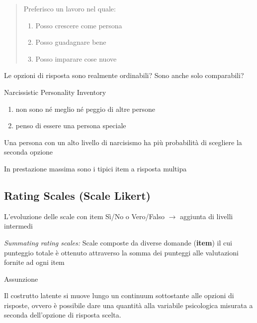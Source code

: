 \documentclass[compress]{beamer}
\begin{document}
\begin{frame}
	
	\begin{quote}
		
		Preferisco un lavoro nel quale: 
		
		\begin{enumerate}
			\item Posso crescere come persona
			\item Posso guadagnare bene
			\item Posso imparare cose nuove
		\end{enumerate}
	\end{quote}
	
	\vspace{2.5mm}
	Le opzioni di risposta sono realmente ordinabili? Sono anche solo comparabili?
	
	\begin{block}{Narcissistic Personality Inventory}
		
		\begin{enumerate}
			\item non sono né meglio né peggio di altre persone
			\item penso di essere una persona speciale 
		\end{enumerate}
		
		Una persona con un alto livello di narcisismo ha più probabilità di scegliere la seconda opzione
	\end{block}
	
	In prestazione massima sono i tipici item a risposta multipa
\end{frame}

\subsection*{Rating Scales (Scale Likert)}


\begin{frame}
	
	L'evoluzione delle scale con item Sì/No o Vero/Falso $\rightarrow$ aggiunta di livelli intermedi
	
	\emph{Summating rating scales:} Scale composte da diverse domande (\textbf{item}) il cui punteggio totale è ottenuto attraverso la somma dei punteggi alle valutazioni fornite ad ogni item
	
	\pause
	\begin{block}{Assunzione}
		
		Il costrutto latente si muove lungo un continuum sottostante alle opzioni di risposte, ovvero è possibile dare una quantità alla variabile psicologica misurata a seconda dell'opzione di risposta scelta. 
		\end{block}
		

\end{frame}
\end{document}

